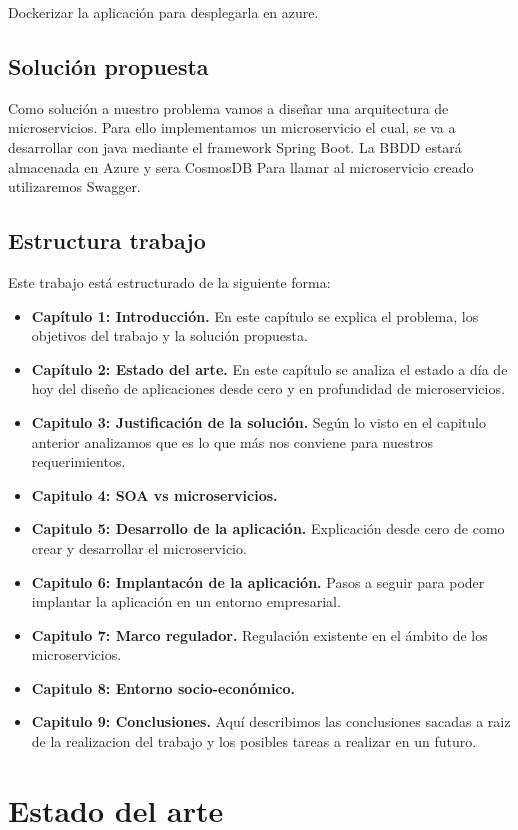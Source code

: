 \documentclass[12pt]{report} %
\begin{document}
	Dockerizar la aplicación para desplegarla en azure.
		
	\section{Solución propuesta}
	Como solución a nuestro problema vamos a diseñar una arquitectura de microservicios.
	Para ello implementamos un microservicio el cual, se va a desarrollar con java mediante el framework Spring Boot.
	La BBDD estará almacenada en Azure y sera CosmosDB
	Para llamar al microservicio creado utilizaremos Swagger.
	
	\section{Estructura trabajo}
	Este trabajo está estructurado de la siguiente forma:
	
	\begin{itemize}
		\item \textbf{Capítulo 1: Introducción.} En este capítulo se explica el problema, los objetivos del trabajo y la solución propuesta.
		\item  \textbf{Capítulo 2: Estado del arte.}  En este capítulo se analiza el estado a día de hoy del diseño de aplicaciones desde cero y en profundidad de microservicios.
		\item  \textbf{Capitulo 3: Justificación de la solución.} Según lo visto en el capitulo anterior analizamos que es lo que más nos conviene para nuestros requerimientos.
		\item  \textbf{Capitulo 4: SOA vs microservicios.} 
		\item  \textbf{Capitulo 5: Desarrollo de la aplicación.} Explicación desde cero de como crear y desarrollar el microservicio. 
		\item  \textbf{Capitulo 6: Implantacón de la aplicación.} Pasos a seguir para poder implantar la aplicación en un entorno empresarial.
		\item  \textbf{Capitulo 7: Marco regulador.} Regulación existente en el ámbito de los microservicios.
		\item  \textbf{Capitulo 8: Entorno socio-económico.}
		\item  \textbf{Capitulo 9: Conclusiones.} Aquí describimos las conclusiones sacadas a raiz de la realizacion del trabajo y los posibles tareas a realizar en un futuro.
	\end{itemize}

	\chapter{Estado del arte}
\end{document}
